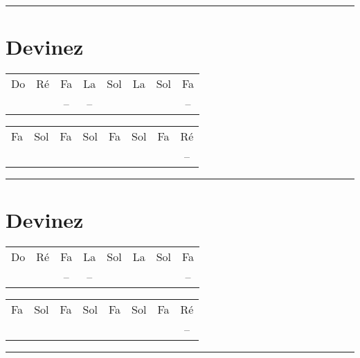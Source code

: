 \documentclass[12pt,a4paper]{article}
\begin{document}
\hrule{}

\section*{Devinez}

\begin{center}
\begin{tabular}{|cccccccc|}
\hline
Do 		& Ré 		& Fa 		& La 		& Sol		& La 		& Sol		& Fa 		\\
\cdot	& \cdot	& --			& --			& \cdot	& \cdot	& \cdot	& --	\\
\hline
\end{tabular}
\begin{tabular}{|cccccccc|}
\hline
Fa 		& Sol 		& Fa 		& Sol 		& Fa		& Sol 		& Fa		& Ré 		\\
\cdot	& \cdot	& \cdot	& \cdot	& \cdot	& \cdot	& \cdot	& --	\\
\hline
\end{tabular}
\end{center}

\hrule{}

\section*{Devinez}

\begin{center}
\begin{tabular}{|cccccccc|}
\hline
Do 		& Ré 		& Fa 		& La 		& Sol		& La 		& Sol		& Fa 		\\
\cdot	& \cdot	& --			& --			& \cdot	& \cdot	& \cdot	& --	\\
\hline
\end{tabular}
\begin{tabular}{|cccccccc|}
\hline
Fa 		& Sol 		& Fa 		& Sol 		& Fa		& Sol 		& Fa		& Ré 		\\
\cdot	& \cdot	& \cdot	& \cdot	& \cdot	& \cdot	& \cdot	& --	\\
\hline
\end{tabular}
\end{center}

\hrule{}
\end{document}
